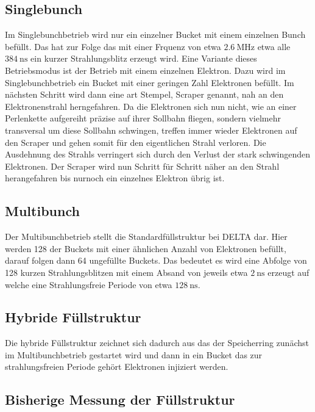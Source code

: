 \subsection{Singlebunch}
\label{sec:Singlebunch}
Im Singlebunchbetrieb wird nur ein einzelner Bucket mit einem einzelnen Bunch befüllt. Das hat zur Folge
das mit einer Frquenz von etwa $\SI{2,6}{\mega\hertz}$ etwa alle $\SI{384}{\nano\second}$ ein kurzer 
Strahlungsblitz erzeugt wird. Eine Variante dieses Betriebsmodus ist der Betrieb mit einem einzelnen
Elektron. Dazu wird im Singlebunchbetrieb ein Bucket mit einer geringen Zahl Elektronen befüllt. Im 
nächsten Schritt wird dann eine art Stempel, Scraper genannt, nah an den Elektronenstrahl herngefahren.
Da die Elektronen sich nun nicht, wie an einer Perlenkette aufgereiht präzise auf ihrer Sollbahn fliegen,
sondern vielmehr transversal um diese Sollbahn schwingen, treffen immer wieder Elektronen auf den Scraper
und gehen somit für den eigentlichen Strahl verloren. Die Ausdehnung des Strahls verringert sich durch den 
Verlust der stark schwingenden Elektronen. Der Scraper wird nun Schritt für Schritt näher an den Strahl 
herangefahren bis nurnoch ein einzelnes Elektron übrig ist.

\subsection{Multibunch}
\label{Multibunch}
Der Multibunchbetrieb stellt die Standardfüllstruktur bei DELTA dar. Hier werden 128 der Buckets mit 
einer ähnlichen Anzahl von Elektronen befüllt, darauf folgen dann 64 ungefüllte Buckets. Das bedeutet es 
wird eine Abfolge von 128 kurzen Strahlungsblitzen mit einem Absand von jeweils etwa 
$\SI{2}{\nano\second}$ erzeugt auf welche eine Strahlungsfreie Periode von etwa $\SI{128}{\nano\second}$.


\subsection{Hybride Füllstruktur}
\label{sec:HybrideFuellstruktur}
Die hybride Füllstruktur zeichnet sich dadurch aus das der Speicherring zunächst im Multibunchbetrieb
gestartet wird und dann in ein Bucket das zur strahlungsfreien Periode gehört Elektronen injiziert werden.

\subsection{Bisherige Messung der Füllstruktur}
\label{sec:WasBisherGeschah}

